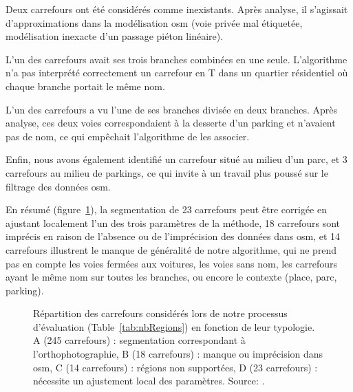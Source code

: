 \newpar{}

Deux carrefours ont été considérés comme inexistants. Après analyse, il s'agissait d'approximations dans la modélisation \gls{osm} (voie privée mal étiquetée, modélisation inexacte d'un passage piéton linéaire).

\newpar{}

L’un des carrefours avait ses trois branches combinées en une seule. L'algorithme n'a pas interprété correctement un carrefour en T dans un quartier résidentiel où chaque branche portait le même nom.

\newpar{}

L’un des carrefours a vu l’une de ses branches divisée en deux branches. Après analyse, ces deux voies correspondaient à la desserte d'un parking et n'avaient pas de nom, ce qui empêchait l'algorithme de les associer.

\newpar{}

Enfin, nous avons également identifié un carrefour situé au milieu d'un parc, et 3 carrefours au milieu de parkings, ce qui invite à un travail plus poussé sur le filtrage des données \gls{osm}.

\newpar{}

En résumé (figure~\ref{fig:camembert}), la segmentation de 23 carrefours peut être corrigée en ajustant localement l'un des trois paramètres de la méthode, 18 carrefours sont imprécis en raison de l'absence ou de l'imprécision des données dans \gls{osm}, et 14 carrefours illustrent le manque de généralité de notre algorithme, qui ne prend pas en compte les voies fermées aux voitures, les voies sans nom, les carrefours ayant le même nom sur toutes les branches, ou encore le contexte (place, parc, parking).

\begin{figure}[ht]
    \centering
    \footnotesize
    \caption{Répartition des carrefours considérés lors de notre processus d'évaluation (Table~\ref{tab:nbRegions}) en fonction de leur typologie. A (245 carrefours) : segmentation correspondant à l'orthophotographie, B (18 carrefours) : manque ou imprécision dans \gls{osm}, C (14 carrefours) : régions non supportées, D (23 carrefours) : nécessite un ajustement local des paramètres. Source: \cite{Favreau2022}.}
    \label{fig:camembert}
\end{figure}

